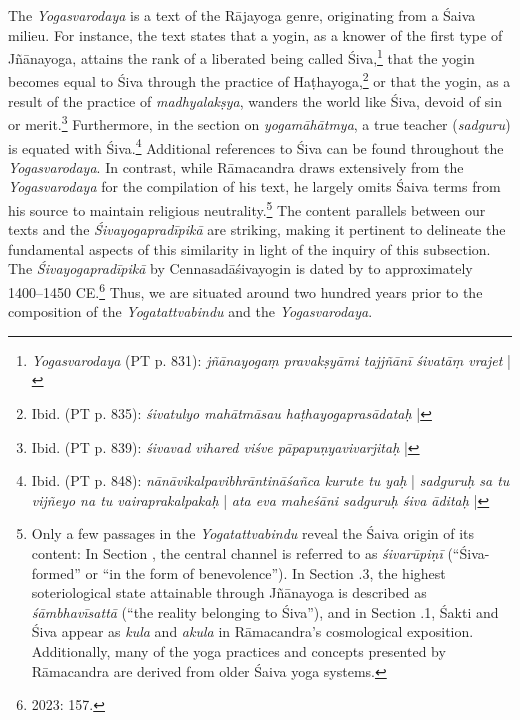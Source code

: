 The \textit{Yogasvarodaya} is a text of the Rājayoga genre, originating from a Śaiva milieu. For instance, the text states that a yogin, as a knower of the first type of Jñānayoga, attains the rank of a liberated being called Śiva,\footnote{\textit{Yogasvarodaya} (PT p. 831): \textit{jñānayogaṃ pravakṣyāmi tajjñānī śivatāṃ vrajet} |} that the yogin becomes equal to Śiva through the practice of Haṭhayoga,\footnote{Ibid. (PT p. 835): \textit{śivatulyo mahātmāsau haṭhayogaprasādataḥ} |} or that the yogin, as a result of the practice of \textit{madhyalakṣya}, wanders the world like Śiva, devoid of sin or merit.\footnote{Ibid. (PT p. 839): \textit{śivavad vihared viśve pāpapuṇyavivarjitaḥ} |} Furthermore, in the section on \textit{yogamāhātmya}, a true teacher (\textit{sadguru}) is equated with Śiva.\footnote{Ibid. (PT p. 848): \textit{nānāvikalpavibhrāntināśañca kurute tu yaḥ} | \textit{sadguruḥ sa tu vijñeyo na tu vairaprakalpakaḥ} | \textit{ata eva maheśāni sadguruḥ śiva āditaḥ} |} Additional references to Śiva can be found throughout the \textit{Yogasvarodaya}. In contrast, while Rāmacandra draws extensively from the \textit{Yogasvarodaya} for the compilation of his text, he largely omits Śaiva terms from his source to maintain religious neutrality.\footnote{Only a few passages in the \textit{Yogatattvabindu} reveal the Śaiva origin of its content: In Section , the central channel is referred to as \textit{śivarūpiṇī} (``Śiva-formed'' or ``in the form of benevolence''). In Section .3, the highest soteriological state attainable through Jñānayoga is described as \textit{śāmbhavīsattā} (``the reality belonging to Śiva''), and in Section .1, Śakti and Śiva appear as \textit{kula} and \textit{akula} in Rāmacandra’s cosmological exposition. Additionally, many of the yoga practices and concepts presented by Rāmacandra are derived from older Śaiva yoga systems.} The content parallels between our texts and the \textit{Śivayogapradīpikā} are striking, making it pertinent to delineate the fundamental aspects of this similarity in light of the inquiry of this subsection. The \textit{Śivayogapradīpikā} by Cennasadāśivayogin is dated by \citeauthor{powell2023} to approximately 1400–1450 CE.\footnote{\citeauthor{powell2023} 2023: 157.} Thus, we are situated around two hundred years prior to the composition of the \textit{Yogatattvabindu} and the \textit{Yogasvarodaya}.

